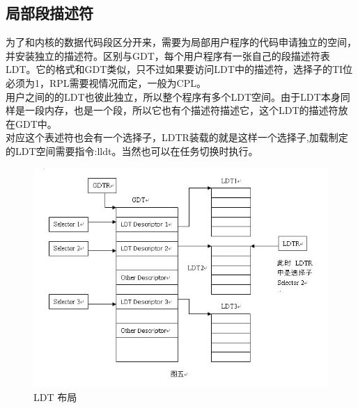 \documentclass[a4paper,11pt,UTF8]{ctexart}
\newcommand{\bottomcaption}{%
\setlength{\abovecaptionskip}{6pt}%
\setlength{\belowcaptionskip}{6pt}%
\caption}
\begin{document}
	\subsection{局部段描述符}
	为了和内核的数据代码段区分开来，需要为局部用户程序的代码申请独立的空间，并安装独立的描述符。区别与GDT，每个用户程序有一张自己的段描述符表LDT。它的格式和GDT类似，只不过如果要访问LDT中的描述符，选择子的TI位必须为1，RPL需要视情况而定，一般为CPL。\\
	用户之间的的LDT也彼此独立，所以整个程序有多个LDT空间。由于LDT本身同样是一段内存，也是一个段，所以它也有个描述符描述它，这个LDT的描述符放在GDT中。\\
	对应这个表述符也会有一个选择子，LDTR装载的就是这样一个选择子,加载制定的LDT空间需要指令:lldt。当然也可以在任务切换时执行。\\
	\begin{figure}[htbp]
		\centering
		\includegraphics[width=15cm]{img/ldt0.png}
		\bottomcaption{LDT 布局}
	\end{figure}
\end{document}
